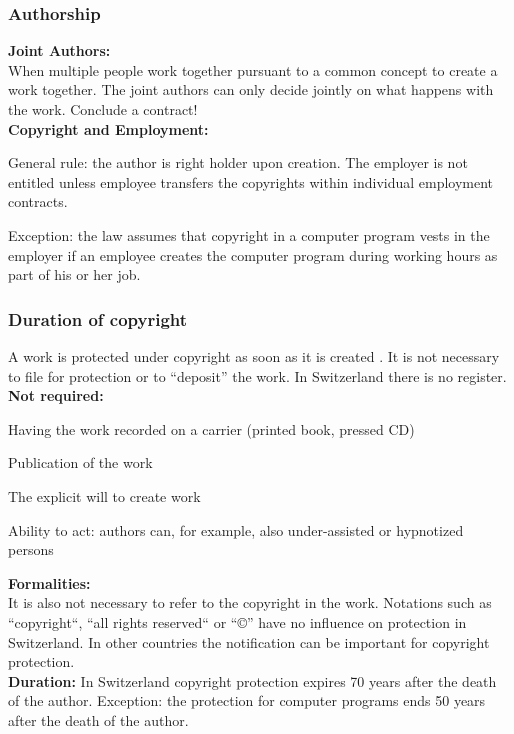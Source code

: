 \subsubsection{Authorship}
\textbf{Joint Authors:} \\
When multiple people work together pursuant to a common concept to create a work together. The joint authors can only decide jointly on what happens with the work. Conclude a contract! \\
\textbf{Copyright and Employment:} 
\begin{compactitem}
	\item General rule: the author is right holder upon creation. The employer is not entitled unless employee transfers the copyrights within individual employment contracts.
	\item Exception: the law assumes that copyright in a computer program vests in the employer if an employee creates the computer program during working hours as part of his or her job.
\end{compactitem}

\subsubsection{Duration of copyright}
A work is protected under copyright as soon as it is created . It is not necessary to file for protection or to “deposit” the work. In Switzerland there is no register.\\
\textbf{Not required:}
\begin{compactitem}
	\item Having the work recorded on a carrier (printed book, pressed CD)
	\item Publication of the work
	\item The explicit will to create work
	\item Ability to act: authors can, for example, also under-assisted or hypnotized persons
\end{compactitem}
\textbf{Formalities:} \\
It is also not necessary to refer to the copyright in the work. Notations such as “copyright“, “all rights reserved“ or “©” have no influence on protection in Switzerland. In other countries the notification can be important for copyright protection. \\
\textbf{Duration:}
In Switzerland copyright protection expires 70 years after the death of the author. Exception: the protection for computer programs ends 50 years after the death of the author.

